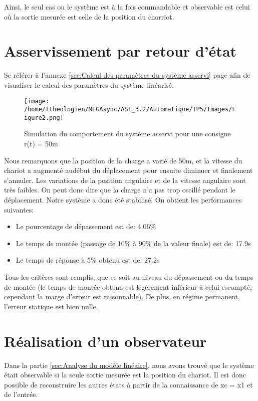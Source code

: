 \documentclass[a4paper,12pt]{article}
\begin{document}
    \par Ainsi, le seul cas ou le système est à la fois commandable et observable est celui où la sortie mesurée est celle de la position du charriot.
  \newpage

  \section{Asservissement par retour d'état}
  \label{sec:Asservissement par retour d'état}
    \par Se référer à l'annexe \ref{sec:Calcul des paramètres du système asservi} page \pageref{sec:Calcul des paramètres du système asservi}
    afin de visualiser le calcul des paramètres du système linéarisé.

    \begin{figure}[h]
      \caption{Simulation du comportement du système asservi pour une consigne r(t) = 50m}
      \centering
      \texttt{[image: /home/ttheologien/MEGAsync/ASI\_3.2/Automatique/TP5/Images/Figure2.png]}
    \end{figure}

    \par Nous remarquons que la position de la charge a varié de 50m, et la vitesse du chariot a augmenté audébut du déplacement pour ensuite diminuer et finalement s’annuler.
    Les variations de la position angulaire et de la vitesse angulaire sont très faibles.
    On peut donc dire que la charge n’a pas trop oscillé pendant le déplacement.
    Notre système a donc été stabilisé.
    On obtient les performances suivantes:
    \begin{itemize}
      \item Le pourcentage de dépassement est de: 4.06\%
      \item Le temps de montée (passage de 10\% à 90\% de la valeur finale) est de: 17.9s
      \item Le temps de réponse à 5\% obtenu est de: 27.2s
    \end{itemize}
    Tous les critères sont remplis, que ce soit au niveau du dépassement ou du temps de montée (le temps de montée obtenu est légèrement inférieur à celui escompté, cependant la marge d'erreur est raisonnable).
    De plus, en régime permanent, l'erreur statique est bien nulle.
  \newpage

  \section{Réalisation d'un observateur}
  \label{sec:Réalisation d'un observateur}
    \par Dans la partie \ref{sec:Analyse du modèle linéaire}, nous avons trouvé que le système était observable si la seule sortie mesurée est la position du chariot.
    Il est donc possible de reconstruire les autres états à partir de la connaissance de xc = x1 et de l'entrée.\\
\end{document}
